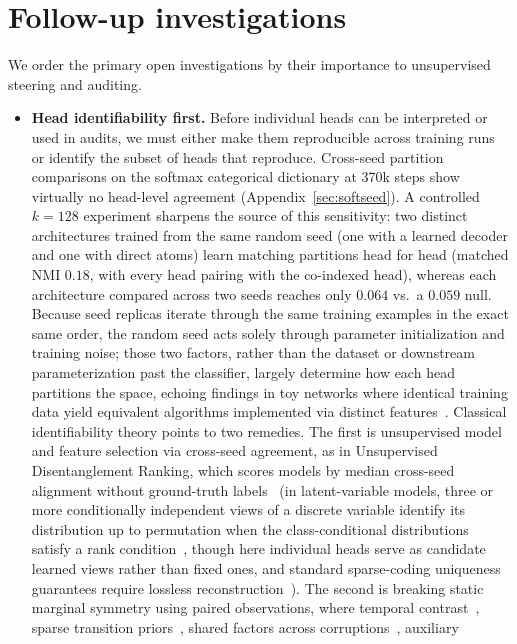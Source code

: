 \section{Follow-up investigations}
\label{sec:followup}

We order the primary open investigations by their importance to
unsupervised steering and auditing.

\begin{itemize}
\item \textbf{Head identifiability first.} Before individual heads can be
interpreted or used in audits, we must either make them reproducible
across training runs or identify the subset of heads that reproduce.
Cross-seed partition comparisons on the softmax categorical dictionary at
370k steps show virtually no head-level agreement
(Appendix~\ref{sec:softseed}). A controlled $k{=}128$ experiment sharpens
the source of this sensitivity: two distinct architectures trained from
the same random seed (one with a learned decoder and one with direct
atoms) learn matching partitions head for head (matched NMI $0.18$, with
every head pairing with the co-indexed head), whereas each architecture
compared across two seeds reaches only $0.064$ vs.\ a $0.059$ null.
Because seed replicas iterate through the
same training examples in the exact same order, the random seed acts
solely through parameter initialization and training noise; those two
factors, rather than the dataset or downstream parameterization past the
classifier, largely determine how each head partitions the space, echoing
findings in toy networks where identical training data yield equivalent
algorithms implemented via distinct features~\cite{chughtai2023}.
Classical identifiability theory points to two remedies. The first is
unsupervised model and feature selection via cross-seed agreement, as in
Unsupervised Disentanglement Ranking, which scores models by median
cross-seed alignment without ground-truth labels~\cite{udr2020} (in
latent-variable models, three or more conditionally independent views of
a discrete variable identify its distribution up to permutation when the
class-conditional distributions satisfy a rank
condition~\cite{allman2009}, though here individual heads serve as
candidate learned views rather than fixed ones, and standard sparse-coding
uniqueness guarantees require lossless
reconstruction~\cite{hillar2015}). The second is breaking static marginal
symmetry using paired observations, where temporal
contrast~\cite{pcl2017}, sparse transition priors~\cite{slowvae2021},
shared factors across corruptions~\cite{locatello2020}, auxiliary

\end{itemize}
